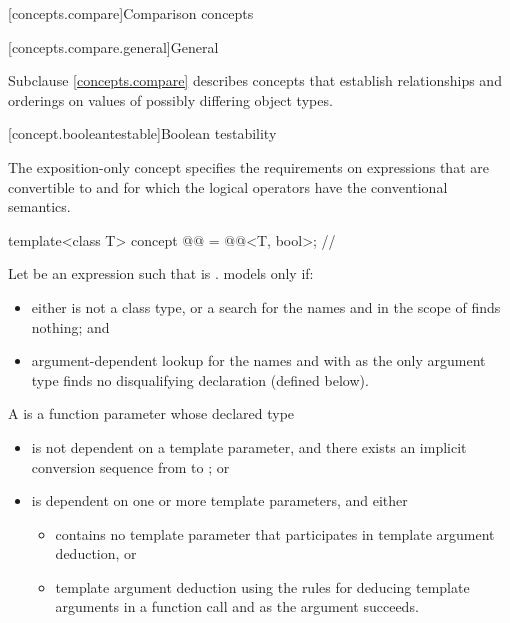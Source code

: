 [concepts.compare]{Comparison concepts}

[concepts.compare.general]{General}

\pnum
Subclause \ref{concepts.compare} describes concepts that establish relationships and orderings
on values of possibly differing object types.

[concept.booleantestable]{Boolean testability}

\pnum
The exposition-only  concept
specifies the requirements on expressions
that are convertible to  and
for which the logical operators
have the conventional semantics.

\begin{itemdecl}
template<class T>
  concept @@ = @@<T, bool>;  // \expos
\end{itemdecl}

\pnum
Let  be an expression such that
 is .
 models  only if:

\begin{itemize}
\item
either  is not a class type, or
a search for the names  and 
in the scope of 
finds nothing; and

\item
argument-dependent lookup
for the names  and 
with  as the only argument type
finds no disqualifying declaration (defined below).
\end{itemize}

\pnum
A 
is a function parameter whose declared type 

\begin{itemize}
\item
is not dependent on a template parameter, and
there exists an implicit conversion sequence
from  to ; or

\item
is dependent on one or more template parameters, and either
\begin{itemize}
\item
{} contains no template parameter that
participates in template argument deduction, or
\item
template argument deduction
using the rules for deducing template arguments
in a function call and
 as the argument succeeds.
\end{itemize}
\end{itemize}

